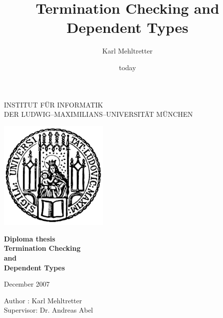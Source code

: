 \documentclass[a4paper,11pt]{report}
\begin{document}
\begin{titlepage}
\begin{center}


\vspace*{-2cm}

{\Huge INSTITUT F\"UR INFORMATIK\\[1mm]} %
DER LUDWIG--MAXIMILIANS--UNIVERSIT\"AT M\"UNCHEN\\

\vspace*{1cm}

\includegraphics[width=0.4\textwidth]{siegel.pdf}

\vspace*{2cm}

{\Large \textbf{Diploma thesis}}\\

\vspace{2.0cm}
{\Huge \textbf{Termination Checking}}\\
\vspace*{3mm}
{\Huge \textbf{and}}\\
\vspace*{3mm}
{\Huge \textbf{Dependent Types}}\\

\vspace{2cm}

\large{December 2007}

\vspace{1.5cm}

  \begin{Large}
      Author : Karl Mehltretter\\
      Supervisor: Dr. Andreas Abel
  \end{Large}


\end{center}
\end{titlepage} 



\title{Termination Checking and Dependent Types}
\author{Karl Mehltretter}
\date{today}
\end{document}

